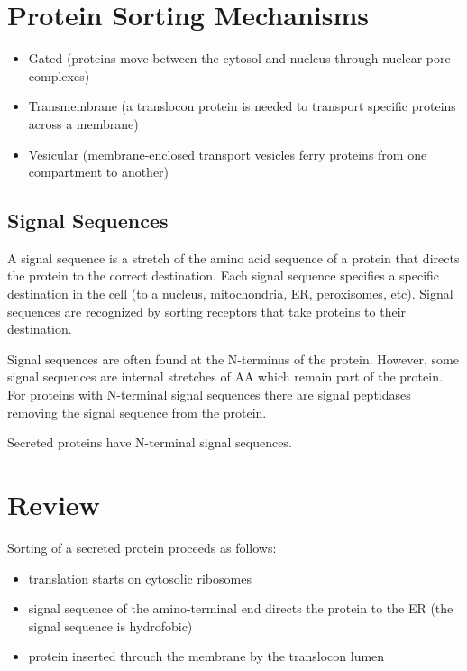 \documentclass[11pt]{scrartcl}
\begin{document}
\section{Protein Sorting Mechanisms}
\begin{itemize}
\item Gated (proteins move between the cytosol and nucleus through nuclear pore complexes)
\item Transmembrane (a translocon protein is needed to transport specific proteins across a membrane)
\item Vesicular (membrane-enclosed transport vesicles ferry proteins from one compartment to another)
\end{itemize}

\subsection{Signal Sequences}

A signal sequence is a stretch of the amino acid sequence of a protein
that directs the protein to the correct destination. Each signal
sequence specifies a specific destination in the cell (to a nucleus,
mitochondria, ER, peroxisomes, etc). Signal sequences are recognized
by sorting receptors that take proteins to their destination.

Signal sequences are often found at the N-terminus of the
protein. However, some signal sequences are internal stretches of AA
which remain part of the protein. For proteins with N-terminal signal
sequences there are signal peptidases removing the signal sequence
from the protein.

Secreted proteins have N-terminal signal sequences.

\section{Review}

Sorting of a secreted protein proceeds as follows:

\begin{itemize}
\item translation starts on cytosolic ribosomes
\item signal sequence of the amino-terminal end directs the protein to the ER (the signal sequence is hydrofobic)
\item protein inserted throuch the membrane by the translocon lumen
\end{itemize}
\end{document}

